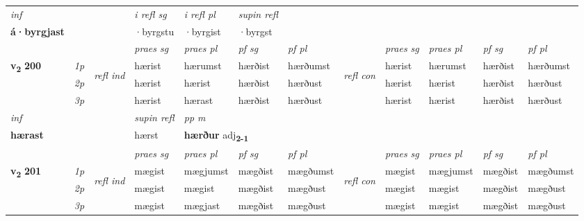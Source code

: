 \begin{longtable}[l]{X>{\footnotesize\itshape}llXXXXlXXXX}
   {\textit{inf}} & &   & \textit{i refl sg} & \textit{i refl pl}   & \textit{supin refl}  \\*
  {\textbf{á\allowbreak ·byrgjast}} & &   & ·byrgstu & ·byrgist   & ·byrgst  \\*

\midrule

 & &   & \textit{praes sg}  & \textit{praes pl}    & \textit{ pf sg} & \textit{pf pl} & & \textit{praes sg}  & \textit{praes pl}    & \textit{pf sg} & \textit{pf pl }  \\ \cmidrule{4-7} \cmidrule{9-12}
 \multirow{2}{*}{{{\textbf{v{\textsubscript{2}}} \Large{\textbf{200}}}}}  & 1p & \multirow{3}{*}{\begin{turn}{90}\textit{refl ind}\end{turn}}  & hærist & hærumst & hærðist & hærðumst & \multirow{3}{*}{\begin{turn}{90}\textit{refl con}\end{turn}}  &hærist & hærumst & hærðist & hærðumst \\*
 & 2p &  & hærist & hærist & hærðist & hærðust & &hærist & hærist & hærðist & hærðust \\*
 & 3p  & & hærist & hærast & hærðist & hærðust & & hærist & hærist& hærðist & hærðust \\*
\cmidrule{4-7} \cmidrule{9-12}

   {\textit{inf}} & &       & \textit{supin refl} & \textit{pp m} \\*
  {\textbf{hærast}} & &       & hærst & \multicolumn{2}{l}{\textbf{hærður} adj\textbf{\textsubscript{2-1}}} \\*

\midrule

 & &   & \textit{praes sg}  & \textit{praes pl}    & \textit{ pf sg} & \textit{pf pl} & & \textit{praes sg}  & \textit{praes pl}    & \textit{pf sg} & \textit{pf pl }  \\ \cmidrule{4-7} \cmidrule{9-12}
 \multirow{2}{*}{{{\textbf{v{\textsubscript{2}}} \Large{\textbf{201}}}}}  & 1p & \multirow{3}{*}{\begin{turn}{90}\textit{refl ind}\end{turn}}  & mægist & mægjumst & mægðist & mægðumst & \multirow{3}{*}{\begin{turn}{90}\textit{refl con}\end{turn}}  &mægist & mægjumst & mægðist & mægðumst \\*
 & 2p &  & mægist & mægist & mægðist & mægðust & &mægist & mægist & mægðist & mægðust \\*
 & 3p  & & mægist & mægjast & mægðist & mægðust & & mægist & mægist& mægðist & mægðust \\*
\cmidrule{4-7} \cmidrule{9-12}


\end{longtable}
